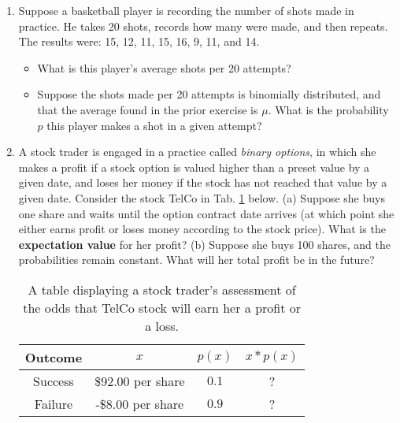 \documentclass{article}
\begin{document}
\begin{enumerate}
\item Suppose a basketball player is recording the number of shots made in practice.  He takes 20 shots, records how many were made, and then repeats.  The results were: 15, 12, 11, 15, 16, 9, 11, and 14.
\begin{itemize}
\item What is this player's average shots per 20 attempts? \\ \vspace{1cm}
\item Suppose the shots made per 20 attempts is binomially distributed, and that the average found in the prior exercise is $\mu$.  What is the probability $p$ this player makes a shot in a given attempt? \\ \vspace{1cm}
\end{itemize}
\item A stock trader is engaged in a practice called \textit{binary options}, in which she makes a profit if a stock option is valued higher than a preset value by a given date, and loses her money if the stock has not reached that value by a given date.  Consider the stock TelCo in Tab. \ref{tab:stock} below.  (a) Suppose she buys one share and waits until the option contract date arrives (at which point she either earns profit or loses money according to the stock price).  What is the \textbf{expectation value} for her profit? (b) Suppose she buys 100 shares, and the probabilities remain constant.  What will her total profit be in the future?
\begin{table}
\centering
\begin{tabular}{| c | c | c | c |}
\hline
\textbf{Outcome} & $x$ & $p(x)$ & $x*p(x)$ \\ \hline \hline
Success & \$92.00 per share & $0.1$ & ? \\ \hline
Failure & -\$8.00 per share & $0.9$ & ? \\ \hline
\hline
\end{tabular}
\caption{\label{tab:stock} A table displaying a stock trader's assessment of the odds that TelCo stock will earn her a profit or a loss.}
\end{table}
\end{enumerate}
\end{document}
